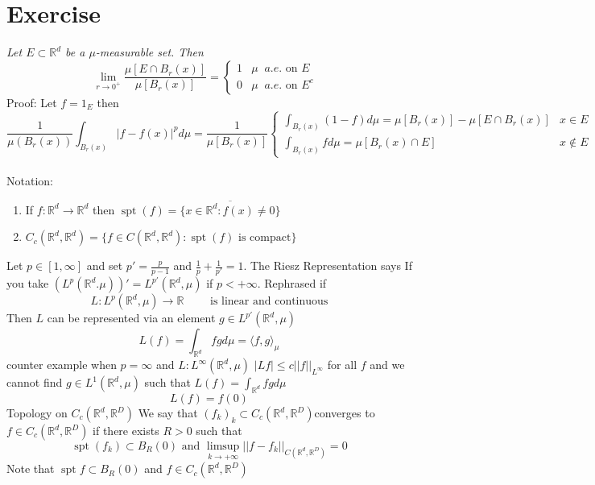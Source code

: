 \documentclass[11pt]{article}
\DeclareMathOperator{\spt}{spt}
\begin{document}
\section{Exercise}
\emph{
    Let $E \subset \mathbb{R}^{d}$ be a $\mu$-measurable set. Then
    \[
        \lim_{r\to 0^{+}} \frac{\mu[E \cap B_r(x)] }{\mu[B_r(x)]} = 
        \begin{cases}
            1 & \mu \;\; a.e. \text{ on $E$}\\
            0 & \mu \;\; a.e. \text{ on $E^{c}$ }
        \end{cases}
    \] 
}
Proof: Let $f = 1_E$ then
 \[
     \frac{1}{\mu(B_r(x))} \int_{ B_r(x)}^{}|f-f(x)|^{p} d \mu =  \frac{1}{\mu[B_r(x)]}
     \begin{cases}
         \int_{B_r(x)}^{}(1-f) d \mu = \mu[B_r(x)] - \mu[E \cap B_r(x)] & x \in E\\
         \int_{B_r(x)}^{}f d \mu = \mu[B_r(x) \cap E] & x \not\in E
     \end{cases}
\] 
\\
Notation:
\begin{enumerate}
    \item If $f: \mathbb{R}^{d} \rightarrow \mathbb{R}^{d}$ then $\spt(f) = \overline{\{x \in \mathbb{R}^{d}: f(x) \ne 0\}}$
    \item $C_c( \mathbb{R}^{d}, \mathbb{R}^{d})  = \{f \in C( \mathbb{R}^{d}, \mathbb{R}^{d}) : \spt(f) \text{ is compact}\}$
\end{enumerate}
Let $p \in [1, \infty]$ and set $p' = \frac{p}{p-1}$ and $\frac{1}{p} + \frac{1}{p'} = 1$. The Riesz Representation says
If you take $(L^{p}( \mathbb{R}^{d}. \mu))' = L^{p'}( \mathbb{R}^{d}, \mu)$ if $p < +\infty$. Rephrased if 
\[
    L : L^{p}( \mathbb{R}^{d}, \mu) \rightarrow \mathbb{R} \qquad \text{ is linear and continuous}
\] 
Then $L$ can be represented via an element $g \in L^{p'}( \mathbb{R}^{d}, \mu)$
\[
L(f) = \int_{ \mathbb{R}^{d}}^{}f g d \mu = \langle f, g \rangle_\mu
\] 
counter example when $p = \infty$ and $L : L^{\infty}( \mathbb{R}^{d}, \mu)$ $|Lf| \le c ||f||_{L^{\infty}}$ for all $f$ and we cannot find $g \in L^{1}( \mathbb{R}^{d}, \mu)$ such that $L(f) = \int_{ \mathbb{R}^{d}}^{}fg d \mu$ 
\[
L(f) = f(0)
\] 
Topology on $C_c( \mathbb{R}^{d}, \mathbb{R}^{D})$ We say that $(f_k)_k \subset C_c( \mathbb{R}^{d}, \mathbb{R}^{D}) $converges to $f \in C_c( \mathbb{R}^{d}, \mathbb{R}^{D}) $ if there exists
$R > 0$ such that 
 \[
     \spt (f_k) \subset B_R(0) \text{ and } \limsup_{k\to +\infty} ||f-f_k||_{C( \mathbb{R}^{d}, \mathbb{R}^{D})} = 0
\] 
Note that $\spt f \subset B_R(0)$ and $f \in C_c( \mathbb{R}^{d}, \mathbb{R}^{D})$
\end{document}
